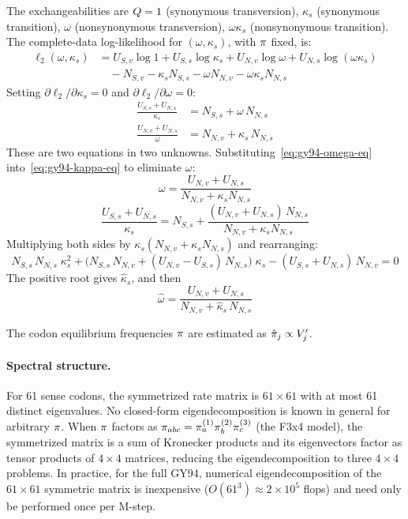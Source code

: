 The exchangeabilities are $Q = 1$ (synonymous transversion),
$\kappa_s$ (synonymous transition),
$\omega$ (nonsynonymous transversion),
$\omega\kappa_s$ (nonsynonymous transition).
The complete-data log-likelihood for $(\omega, \kappa_s)$,
with $\pi$ fixed, is:
\begin{align*}
\ell_2(\omega,\kappa_s) &=
  U_{S,v}\log 1 + U_{S,s}\log\kappa_s + U_{N,v}\log\omega + U_{N,s}\log(\omega\kappa_s) \\
  &\quad - N_{S,v} - \kappa_s N_{S,s} - \omega N_{N,v} - \omega\kappa_s N_{N,s}
\end{align*}
Setting $\partial\ell_2/\partial\kappa_s = 0$ and $\partial\ell_2/\partial\omega = 0$:
\begin{align}
\frac{U_{S,s} + U_{N,s}}{\kappa_s} &= N_{S,s} + \omega\, N_{N,s} \label{eq:gy94-kappa-eq} \\
\frac{U_{N,v} + U_{N,s}}{\omega} &= N_{N,v} + \kappa_s\, N_{N,s} \label{eq:gy94-omega-eq}
\end{align}
These are two equations in two unknowns. Substituting~\eqref{eq:gy94-omega-eq}
into~\eqref{eq:gy94-kappa-eq} to eliminate $\omega$:
\[
\omega = \frac{U_{N,v} + U_{N,s}}{N_{N,v} + \kappa_s N_{N,s}}
\]
\[
\frac{U_{S,s} + U_{N,s}}{\kappa_s} = N_{S,s} + \frac{(U_{N,v} + U_{N,s})\, N_{N,s}}{N_{N,v} + \kappa_s N_{N,s}}
\]
Multiplying both sides by $\kappa_s(N_{N,v} + \kappa_s N_{N,s})$ and rearranging:
\begin{equation}
\label{eq:gy94-kappa-quad}
N_{S,s}\, N_{N,s}\;\kappa_s^2
+ \bigl(N_{S,s}\, N_{N,v} + (U_{N,v} - U_{S,s})\,N_{N,s}\bigr)\;\kappa_s
- (U_{S,s}+U_{N,s})\, N_{N,v} = 0
\end{equation}
The positive root gives $\hat{\kappa}_s$,
and then
\begin{equation}
\label{eq:gy94-omega}
\hat{\omega} = \frac{U_{N,v} + U_{N,s}}{N_{N,v} + \hat{\kappa}_s\, N_{N,s}}
\end{equation}

The codon equilibrium frequencies $\pi$ are estimated as
$\hat{\pi}_j \propto V'_j$.

\paragraph{Spectral structure.}
For 61 sense codons, the symmetrized rate matrix is $61 \times 61$
with at most 61 distinct eigenvalues.
No closed-form eigendecomposition is known in general for
arbitrary $\pi$.
When $\pi$ factors as $\pi_{abc} = \pi^{(1)}_a \pi^{(2)}_b \pi^{(3)}_c$
(the F3x4 model), the symmetrized matrix is a sum of Kronecker products
and its eigenvectors factor as tensor products of $4\times 4$ matrices,
reducing the eigendecomposition to three $4\times 4$ problems.
In practice, for the full GY94, numerical eigendecomposition of the
$61 \times 61$ symmetric matrix is inexpensive ($O(61^3) \approx 2 \times 10^5$ flops)
and need only be performed once per M-step.



